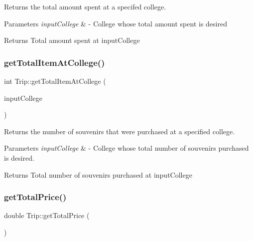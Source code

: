 Returns the total amount spent at a specifed college. 


\begin{DoxyParams}{Parameters}
{\em input\+College} & -\/ College whose total amount spent is desired \\
\hline
\end{DoxyParams}
\begin{DoxyReturn}{Returns}
Total amount spent at input\+College 
\end{DoxyReturn}
\mbox{\label{class_trip_ac636b0c45604cd57feba441a07d90097}} 
\subsubsection{\texorpdfstring{get\+Total\+Item\+At\+College()}{getTotalItemAtCollege()}}
{\footnotesize\ttfamily int Trip\+::get\+Total\+Item\+At\+College (\begin{DoxyParamCaption}\item[{Q\+String}]{input\+College }\end{DoxyParamCaption})}



Returns the number of souvenirs that were purchased at a specified college. 


\begin{DoxyParams}{Parameters}
{\em input\+College} & -\/ College whose total number of souvenirs purchased is desired. \\
\hline
\end{DoxyParams}
\begin{DoxyReturn}{Returns}
Total number of souvenirs purchased at input\+College 
\end{DoxyReturn}
\mbox{\label{class_trip_abf1da7d48ac859be42992e1fc3489e50}} 
\subsubsection{\texorpdfstring{get\+Total\+Price()}{getTotalPrice()}}
{\footnotesize\ttfamily double Trip\+::get\+Total\+Price (\begin{DoxyParamCaption}{ }\end{DoxyParamCaption})}



